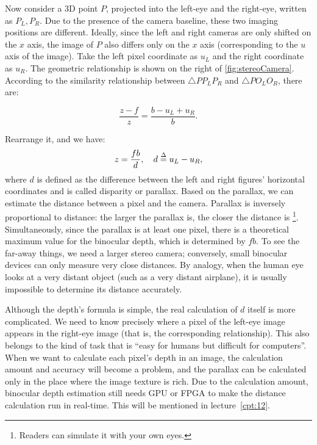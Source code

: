 Now consider a 3D point $P$, projected into the left-eye and the right-eye, written as $P_L, P_R$. Due to the presence of the camera baseline, these two imaging positions are different. Ideally, since the left and right cameras are only shifted on the $x$ axis, the image of $P$ also differs only on the $x$ axis (corresponding to the $u$ axis of the image). Take the left pixel coordinate as $u_L$ and the right coordinate as $u_R$. The geometric relationship is shown on the right of \autoref{fig:stereoCamera}. According to the similarity relationship between $ \triangle P P_L P_R$ and $\triangle P O_L O_R$, there are:

\begin{equation}
\frac{{z - f}}{z} = \frac{{b - {u_L} + {u_R}}}{b}.
\end{equation}

Rearrange it, and we have:
\begin{equation}
z = \frac{{fb}}{d}, \quad d \buildrel \Delta \over = {u_L} - {u_R},
\end{equation}
where $d$ is defined as the difference between the left and right figures' horizontal coordinates and is called disparity or parallax. Based on the parallax, we can estimate the distance between a pixel and the camera. Parallax is inversely proportional to distance: the larger the parallax is, the closer the distance is \footnote {Readers can simulate it with your own eyes.}. Simultaneously, since the parallax is at least one pixel, there is a theoretical maximum value for the binocular depth, which is determined by $fb$. To see the far-away things, we need a larger stereo camera; conversely, small binocular devices can only measure very close distances. By analogy, when the human eye looks at a very distant object (such as a very distant airplane), it is usually impossible to determine its distance accurately.

Although the depth's formula is simple, the real calculation of $d$ itself is more complicated. We need to know precisely where a pixel of the left-eye image appears in the right-eye image (that is, the corresponding relationship). This also belongs to the kind of task that is ``easy for humans but difficult for computers''. When we want to calculate each pixel's depth in an image, the calculation amount and accuracy will become a problem, and the parallax can be calculated only in the place where the image texture is rich. Due to the calculation amount, binocular depth estimation still needs GPU or FPGA to make the distance calculation run in real-time. This will be mentioned in lecture~\ref{cpt:12}.

